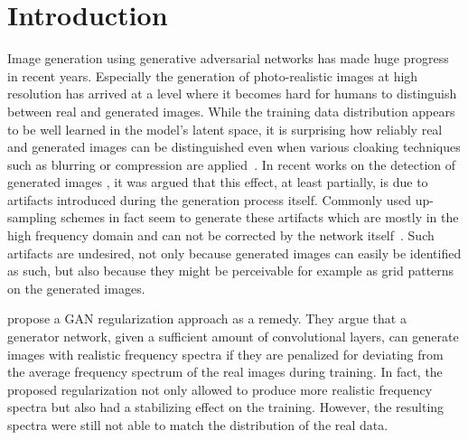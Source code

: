 \documentclass[letterpaper]{article} %
\begin{document}
\section{Introduction}
Image generation using generative adversarial networks has made huge progress in recent years. Especially the generation of photo-realistic images at high resolution has arrived at a level where it becomes hard for humans to distinguish between real and generated images. While the training data distribution appears to be well learned in the model's latent space, it is surprising how reliably real and generated images can be distinguished even when various cloaking techniques such as blurring or compression are applied~\cite{cispa2965}. In recent works on the detection of generated images \cite{frank2020leveraging,margret2020upconvolution}, it was argued that this effect, at least partially, is due to artifacts introduced during the generation process itself. Commonly used up-sampling schemes in fact seem to generate these artifacts which are mostly in the high frequency domain and can not be corrected by the network itself~\cite{frank2020leveraging,margret2020upconvolution,bai2020fake}. %
Such artifacts are undesired, not only because generated images can easily be identified as such, but also because they might be perceivable for example as grid patterns on the generated images.

\citet{margret2020upconvolution} propose a GAN regularization approach as a remedy. They argue that a generator network, given a sufficient amount of convolutional layers, can generate images with realistic frequency spectra if they are penalized for deviating from the average frequency spectrum of the real images during training. In fact, the proposed regularization not only allowed to produce more realistic frequency spectra but also had a stabilizing effect on the training.
However, the resulting spectra were still not able to match the distribution of the real data. 
\end{document}
